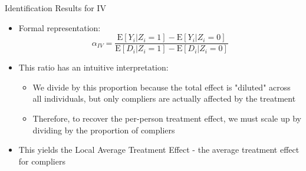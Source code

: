 \documentclass[dvipsnames,hyperref={pdfpagelabels=false}]{beamer}
\begin{document}
\begin{frame}{Identification Results for IV}
	\begin{itemize}

		\item Formal representation:
		\begin{equation*}
			\alpha_{IV}=\dfrac{\mathrm{E}[Y_{i}|Z_{i}=1]-\mathrm{E}[Y_{i}|Z_{i}=0]}{\mathrm{E}[D_{i}|Z_{i}=1]-\mathrm{E}[D_{i}|Z_{i}=0]}
		\end{equation*} 
		
		\item This ratio has an intuitive interpretation:
		\vspace{0.2cm}
		\begin{itemize}
			\item We divide by this proportion because the total effect is "diluted" across all individuals, but only compliers are actually affected by the treatment
			\vspace{0.2cm}
			\item Therefore, to recover the per-person treatment effect, we must scale up by dividing by the proportion of compliers
		\end{itemize}
					\vspace{0.2cm}
			\item This yields the Local Average Treatment Effect - the average treatment effect for compliers 
		
	\end{itemize}
\end{frame}
\end{document}
